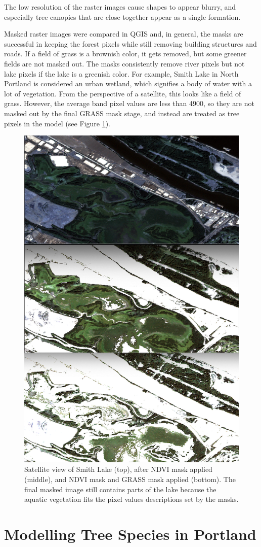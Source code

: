 \documentclass[12pt,twoside]{reedthesis}
\begin{document}
The low resolution of the raster images cause shapes to appear blurry, and especially tree canopies that are close together appear as a single formation.

Masked raster images were compared in QGIS and, in general, the masks are successful in keeping the forest pixels while still removing building structures and roads. If a field of grass is a brownish color, it gets removed, but some greener fields are not masked out. The masks consistently remove river pixels but not lake pixels if the lake is a greenish color. For example, Smith Lake in North Portland is considered an urban wetland, which signifies a body of water with a lot of vegetation. From the perspective of a satellite, this looks like a field of grass. However, the average band pixel values are less than 4900, so they are not masked out by the final GRASS mask stage, and instead are treated as tree pixels in the model (see Figure \ref{fig:masklimit}).
\begin{figure}

{\centering \includegraphics[width=0.4\linewidth]{figure/masklimit} 

}

\caption{Satellite view of Smith Lake (top), after NDVI mask applied (middle), and NDVI mask and GRASS mask applied (bottom). The final masked image still contains parts of the lake because the aquatic vegetation fits the pixel values descriptions set by the masks.}\label{fig:masklimit}
\end{figure}
\hypertarget{modelling-tree-species-in-portland}{%
\section{Modelling Tree Species in Portland}\label{modelling-tree-species-in-portland}}
\end{document}
